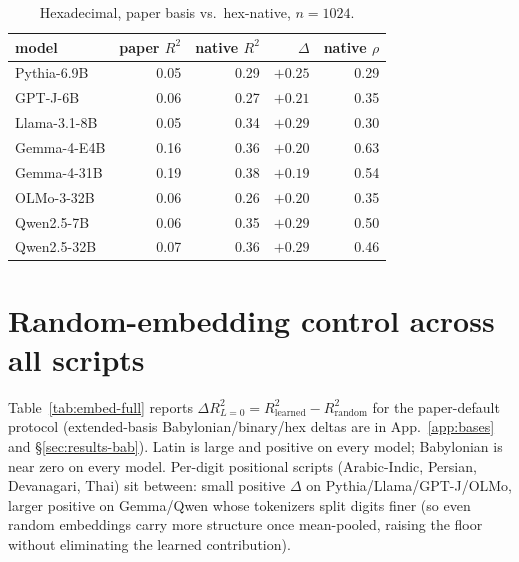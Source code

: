 \documentclass[10pt,letterpaper]{article}
\begin{document}
\begin{table}[h]
\caption{Hexadecimal, paper basis vs.\ hex-native, $n=1024$.}
\label{tab:hex-native}
\centering
\small
\begin{tabular}{lrrrr}
\toprule
model & paper $R^2$ & native $R^2$ & $\Delta$ & native $\rho$ \\
\midrule
Pythia-6.9B    & 0.05 & 0.29 & $+0.25$ & 0.29 \\
GPT-J-6B       & 0.06 & 0.27 & $+0.21$ & 0.35 \\
Llama-3.1-8B   & 0.05 & 0.34 & $+0.29$ & 0.30 \\
Gemma-4-E4B    & 0.16 & 0.36 & $+0.20$ & 0.63 \\
Gemma-4-31B    & 0.19 & 0.38 & $+0.19$ & 0.54 \\
OLMo-3-32B     & 0.06 & 0.26 & $+0.20$ & 0.35 \\
Qwen2.5-7B     & 0.06 & 0.35 & $+0.29$ & 0.50 \\
Qwen2.5-32B    & 0.07 & 0.36 & $+0.29$ & 0.46 \\
\bottomrule
\end{tabular}
\end{table}

\section{Random-embedding control across all scripts}
\label{app:embed-control}

Table~\ref{tab:embed-full} reports $\Delta R^2_{L=0} =
R^2_{\mathrm{learned}} - R^2_{\mathrm{random}}$ for the
paper-default protocol (extended-basis Babylonian/binary/hex
deltas are in App.~\ref{app:bases} and \S\ref{sec:results-bab}).
Latin is large and positive on every model; Babylonian is near zero
on every model. Per-digit positional scripts (Arabic-Indic, Persian,
Devanagari, Thai) sit between: small positive $\Delta$ on
Pythia/Llama/GPT-J/OLMo, larger positive on Gemma/Qwen whose
tokenizers split digits finer (so even random embeddings carry more
structure once mean-pooled, raising the floor without eliminating
the learned contribution).
\end{document}
